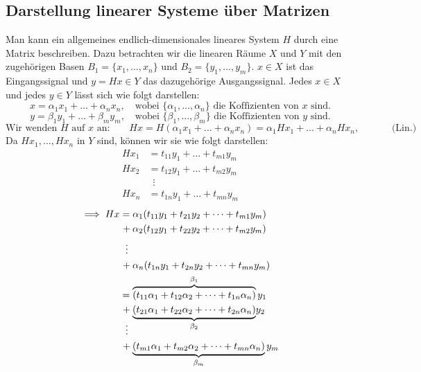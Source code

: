 \documentclass[11pt]{article}
\begin{document}
\subsection*{Darstellung linearer Systeme über Matrizen}
\vspace*{-0.5cm}
Man kann ein allgemeines endlich-dimensionales lineares System $H$ durch eine Matrix beschreiben. Dazu betrachten wir die linearen Räume $X$ und $Y$ mit den zugehörigen Basen $B_1 = \{x_1, \dots, x_n\}$ und $B_2 = \{ y_1, \dots, y_m \}$. $x\in X$ ist das Eingangssignal und $y=Hx \in Y$ das dazugehörige Ausgangssignal. Jedes $x\in X$ und jedes $y\in Y$ lässt sich wie folgt darstellen:
$$x = \alpha_1 x_1 + \dots + \alpha_n x_n, \hspace{12pt} \text{wobei } \{\alpha_1, \dots, \alpha_n\} \text{ die Koffizienten von } x \text{ sind.}$$
$$y = \beta_1 y_1 + \dots + \beta_m y_m, \hspace{12pt} \text{wobei } \{\beta_1, \dots, \beta_m\} \text{ die Koffizienten von } y \text{ sind.}$$
$$\text{Wir wenden }H \text{ auf } x \text{ an:} \hspace{24pt} Hx = H(\alpha_1 x_1 + \dots + \alpha_n x_n) = \alpha_1 Hx_1 + \dots + \alpha_n Hx_n, \hspace{40pt} \text{(Lin.)}$$
Da $Hx_1, \dots, Hx_n$ in $Y$ sind, können wir sie wie folgt darstellen:
\begin{align*}
    Hx_1 &= t_{11}y_1 + \dots + t_{m1}y_m \\
    Hx_2 &= t_{12}y_1 + \dots + t_{m2}y_m \\
    &\hspace{6pt}\vdots \\
    Hx_n &= t_{1n}y_1 + \dots + t_{mn}y_m
\end{align*}
\begin{align*}
    \implies Hx &= \alpha_1(t_{11}y_1 + t_{21}y_2 + \dots + t_{m1}y_m) \\
    &\hspace{1pt}+ \alpha_2(t_{12}y_1 + t_{22}y_2 + \dots + t_{m2}y_m) \\
    &\hspace{6pt}\vdots \\
    &\hspace{1pt}+ \alpha_n(t_{1n}y_1 + t_{2n}y_2 + \dots + t_{mn}y_m) \\
    &= \overbrace{(t_{11}\alpha_1 + t_{12}\alpha_2 + \dots + t_{1n}\alpha_n)}^{\beta_1}y_1 \\
    &\hspace{1pt}+ \smash{\underbrace{(t_{21}\alpha_1 + t_{22}\alpha_2 + \dots + t_{2n}\alpha_n)}_{\beta_2}}y_2\\
    &\hspace{6pt}\vdots \\
    &\hspace{1pt}+ \underbrace{(t_{m1}\alpha_1 + t_{m2}\alpha_2 + \dots + t_{mn}\alpha_n)}_{\beta_m}y_m
\end{align*}
\end{document}
